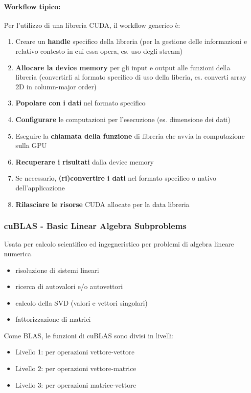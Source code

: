 \paragraph{Workflow tipico:} Per l'utilizzo di una libreria CUDA, il workflow generico è:
\begin{enumerate}
	\item Creare un \textbf{handle} specifico della libreria (per la gestione delle informazioni e relativo contesto in cui essa opera, es. uso degli stream)
	\item \textbf{Allocare la device memory} per gli input e output alle funzioni della libreria (convertirli al formato specifico di uso della liberia, es. converti array 2D in column-major order)
	\item \textbf{Popolare con i dati} nel formato specifico
	\item \textbf{Configurare} le computazioni per l'esecuzione (es. dimensione dei dati)
	\item Eseguire la \textbf{chiamata della funzione} di libreria che avvia la computazione sulla GPU
	\item \textbf{Recuperare i risultati} dalla device memory
	\item Se necessario, \textbf{(ri)convertire i dati} nel formato specifico o nativo dell'applicazione
	\item \textbf{Rilasciare le risorse} CUDA allocate per la data libreria
\end{enumerate}

\subsubsection{cuBLAS - Basic Linear Algebra Subproblems}

Usata per calcolo scientifico ed ingegneristico per problemi di algebra lineare numerica
\begin{itemize}
	\item risoluzione di sistemi lineari
	\item ricerca di autovalori e/o autovettori
	\item calcolo della SVD (valori e vettori singolari)
	\item fattorizzazione di matrici
\end{itemize}

Come BLAS, le funzioni di cuBLAS sono divisi in livelli: 
\begin{itemize}
	\item Livello 1: per operazioni vettore-vettore
	\item Livello 2: per operazioni vettore-matrice
	\item Livello 3: per operazioni matrice-vettore
\end{itemize}

